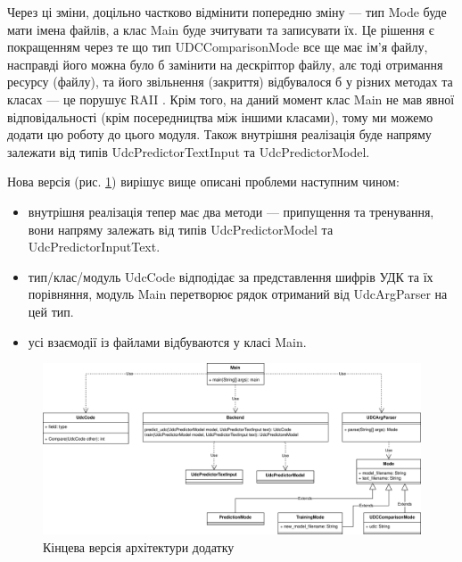 \documentclass[14pt]{extarticle}
\begin{document}
  \newpage

  Через ці зміни, доцільно частково відмінити попередню зміну ---
  тип Mode буде мати імена файлів, а клас Main буде зчитувати та записувати їх.
  Це рішення є покращенням через те що тип
  UDCComparisonMode все ще має ім'я файлу,
  насправді його можна було б замінити на дескріптор файлу,
  алє тоді отримання ресурсу (файлу),
  та його звільнення (закриття) відбувалося б у різних методах та класах ---
  це порушує RAII \cite{wiki_raii}.
  Крім того, на даний момент клас Main не мав явної відповідальності
  (крім посередництва між іншими класами),
  тому ми можемо додати цю роботу до цього модуля.
  Також внутрішня реалізація буде напряму залежати
  від типів UdcPredictorTextInput та UdcPredictorModel.

  Нова версія (рис. \ref{fig:io_uml6}) вирішує вище описані проблеми
  наступним чином:
  \begin{itemize}[labelindent=\dimexpr{}\relax, leftmargin=*]
    \item внутрішня реалізація тепер має два методи ---
    припущення та тренування,
    вони напряму залежать від типів UdcPredictorModel та \\ UdcPredictorInputText.
    \item тип/клас/модуль UdcCode відподідає за представлення шифрів УДК
    та їх порівняння,
    модуль Main перетворює рядок отриманий від UdcArgParser на цей тип.
    \item усі взаємодії із файлами відбуваются у класі Main.
  \end{itemize}

  \begin{figure}
    \centering
    \includegraphics[height=0.45\textwidth]{io_uml6.drawio.png}
    \captionsetup{justification=centering}  
    \caption{Кінцева версія архітектури додатку}
    \label{fig:io_uml6}
  \end{figure}
\end{document}
